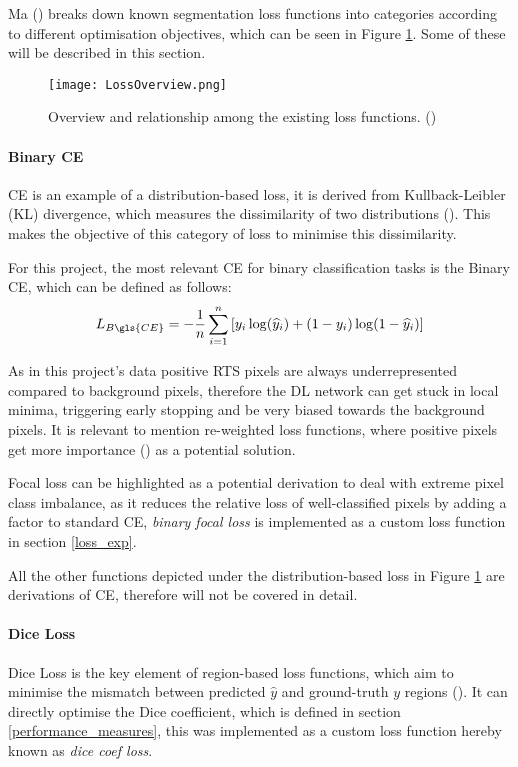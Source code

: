 Ma (\cite{LossOdyssey}) breaks down known segmentation loss functions into categories according to different optimisation objectives, which can be seen in Figure \ref{fig_loss_odissey}. Some of these will be described in this section.

    \begin{figure}[hbt!]
        \centering
        \texttt{[image: LossOverview.png]}
        \caption{Overview and relationship among the existing loss functions. (\cite{LossOdyssey})}
        \label{fig_loss_odissey}
    \end{figure}


\paragraph{Binary \gls{CE}}
\gls{CE} is an example of a distribution-based loss, it is derived from Kullback-Leibler (KL) divergence, which measures the dissimilarity of two distributions (\cite{LossOdyssey}). This makes the objective of this category of loss to minimise this dissimilarity. 

For this project, the most relevant \gls{CE} for binary classification tasks is the Binary \gls{CE}, which can be defined as follows:
\begin{equation} \label{eq:bintropy}
L_{B\gls{CE}} = -\frac{1}{n}\sum_{i=1}^n{[y_{i} \log(\widehat{y}_{i})+(1-y_{i})\log(1-\widehat{y}_{i})]}
\end{equation}

As in this project's data positive \gls{RTS} pixels are always underrepresented compared to background pixels, therefore the \gls{DL} network can get stuck in local minima, triggering early stopping and be very biased towards the background pixels. 
 It is relevant to mention re-weighted loss functions, where positive pixels get more importance (\cite{ronneberger2015unet}) as a potential solution.
 
Focal loss can be highlighted as a potential derivation to deal with extreme pixel class imbalance, as it reduces the relative loss of well-classified pixels by adding a factor to standard \gls{CE}, \textit{binary focal loss} is implemented as a custom loss function in section \ref{loss_exp}.
 
All the other functions depicted under the distribution-based loss in Figure \ref{fig_loss_odissey} are derivations of \gls{CE}, therefore will not be covered in detail. 
\paragraph{Dice Loss}
Dice Loss is the key element of region-based loss functions, which aim to minimise the mismatch between predicted $\widehat{y}$ and ground-truth $y$ regions (\cite{LossOdyssey}). It can directly optimise the Dice coefficient, which is defined in section \ref{performance_measures}, this was implemented as a custom loss function hereby known as \textit{dice coef loss}.

